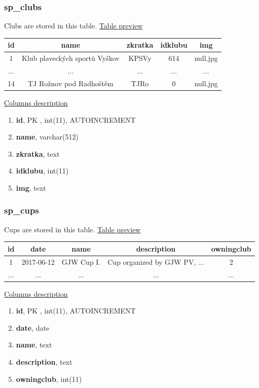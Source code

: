 \subsubsection*{sp\_clubs}
Clubs are stored in this table. 
\newline
\underline{Table preview}
\begin{center}
 \begin{tabular}{||c c c c c||} 
 \hline
 id & name & zkratka & idklubu & img \\ [0.5ex] 
 \hline\hline
 1 & Klub plaveckých sportů Vyškov & KPSVy & 614 & null.jpg \\  
 \hline
 ... & ... & ... & ... & ... \\ [0.5ex]
\hline
 14 & TJ Rožnov pod Radhoštěm & TJRo & 0 & null.jpg \\
 \hline
\end{tabular}
\end{center}
\underline{Columns description}
\begin{enumerate}
  \setlength\itemsep{0em}
  \item \textbf{id}, PK , int(11), AUTOINCREMENT
  \item \textbf{name}, varchar(512)
  \item \textbf{zkratka}, text
  \item \textbf{idklubu}, int(11)
  \item \textbf{img}, text
\end{enumerate}

\subsubsection*{sp\_cups}
Cups are stored in this table.
\newline
\underline{Table preview}
\begin{center}
 \begin{tabular}{||c c c c c||} 
 \hline
 id & date & name & description & owningclub  \\ [0.5ex] 
 \hline\hline
 1 & 2017-06-12 & GJW Cup I. & Cup organized by GJW PV, ... & 2 \\ 
 \hline
 ... & ... & ... & ... & ...  \\ [0.5ex] 
 \hline
\end{tabular}
\end{center}
\underline{Columns description}
\begin{enumerate}
  \setlength\itemsep{0em}
  \item \textbf{id}, PK , int(11), AUTOINCREMENT
  \item \textbf{date}, date
  \item \textbf{name}, text
  \item \textbf{description}, text
  \item \textbf{owningclub}, int(11)
\end{enumerate}


